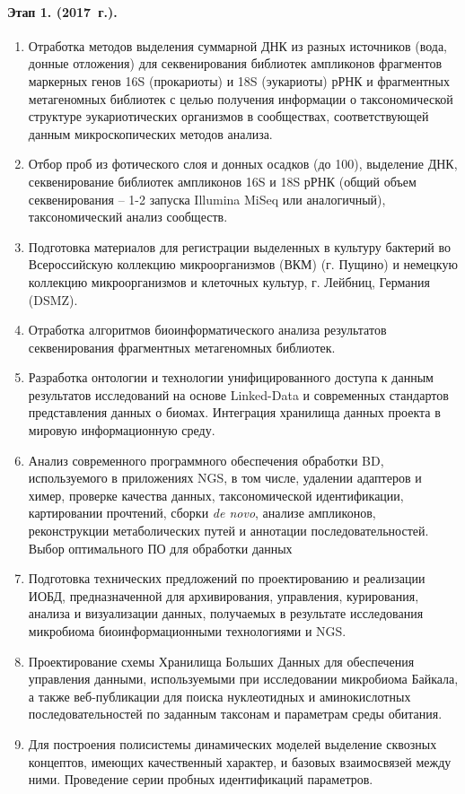 \documentclass[a4paper,12pt,openany,final]{extreport}
\makeatletter
\newcommand\theyear{2017}
\def\vhrulefill#1{\leavevmode\leaders\hrule\@height#1\hfill \kern\z@}
\newcommand\bottomrule{\noindent\vhrulefill{2pt}}
\makeatother
\begin{document}
\paragraph{Этап 1. (\theyear~г.).}
\begin{enumerate}
\item Отработка методов выделения суммарной ДНК из разных
  источников (вода, донные отложения) для секвенирования библиотек
  ампликонов фрагментов маркерных генов 16S (прокариоты) и 18S
  (эукариоты) рРНК и фрагментных метагеномных библиотек с целью
  получения информации о таксономической структуре эукариотических
  организмов в сообществах, соответствующей данным микроскопических
  методов анализа.

\item  Отбор проб из фотического слоя и донных осадков (до 100), выделение
ДНК, секвенирование библиотек ампликонов 16S и 18S рРНК (общий объем
секвенирования -- 1-2 запуска Illumina MiSeq или аналогичный),
таксономический анализ сообществ.

\item  Подготовка материалов для регистрации выделенных в культуру бактерий
во Всероссийскую коллекцию микроорганизмов (ВКМ) (г. Пущино) и немецкую
коллекцию микроорганизмов и клеточных культур, г. Лейбниц, Германия
(DSMZ).

\item Отработка алгоритмов биоинформатического анализа результатов
секвенирования фрагментных метагеномных библиотек.

\item  Разработка онтологии и технологии унифицированного доступа к данным
результатов исследований на основе Linked-Data и современных стандартов
представления данных о биомах. Интеграция хранилища данных проекта в
мировую информационную среду.

\item  Анализ современного программного обеспечения обработки BD,
используемого в приложениях NGS, в том числе, удалении адаптеров и
химер, проверке качества данных, таксономической идентификации,
картировании прочтений, сборки \textit{de novo}, анализе ампликонов,
реконструкции метаболических путей и аннотации последовательностей.
Выбор оптимального ПО для обработки данных

\item  Подготовка технических предложений по проектированию и реализации
ИОБД, предназначенной для архивирования, управления, курирования,
анализа и визуализации данных, получаемых в результате исследования
микробиома биоинформационными технологиями и NGS.

\item  Проектирование схемы Хранилища Больших Данных для обеспечения
управления данными, используемыми при исследовании микробиома Байкала, а
также веб-публикации для поиска нуклеотидных и аминокислотных
последовательностей по заданным таксонам и параметрам среды обитания.

\item  Для построения полисистемы динамических моделей выделение сквозных
концептов, имеющих качественный характер, и базовых взаимосвязей между
ними. Проведение серии пробных идентификаций параметров.\strut
\end{enumerate}


\label{chap:comm}
\end{document}
